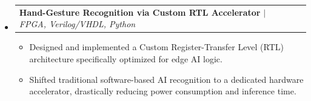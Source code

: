 \documentclass[letterpaper,10pt]{article}
\makeatletter
\newcommand{\resumeItem}[1]{
  \item\small{
    {#1 \vspace{-2pt}}
  }
}
\newcommand{\resumeProjectHeading}[2]{
    \item
    \begin{tabular*}{0.97\textwidth}{l@{\extracolsep{\fill}}r}
      \small#1 & #2 \\
    \end{tabular*}\vspace{-5pt}
}
\makeatother
\begin{document}
\begin{itemize}[leftmargin=0.15in, label={}]
          {\textbf{Advanced Driver Assistance Systems (ADAS)} $|$ \emph{Python, OpenCV, PyTorch, C++, Sensors}}{}
          \begin{itemize}[leftmargin=0.15in, label={\small$\bullet$}]
            \resumeItem{Architected an integrated ADAS pipeline focused on real-time data processing and computer vision.}
            \resumeItem{Fused hardware sensor data with machine learning object detection models to evaluate real-time environmental conditions and reduce processing latency.}
          \end{itemize}
      \vspace{-2pt}
      \resumeProjectHeading
          {\textbf{Hand-Gesture Recognition via Custom RTL Accelerator} $|$ \emph{FPGA, Verilog/VHDL, Python}}{}
          \begin{itemize}[leftmargin=0.15in, label={\small$\bullet$}]
            \resumeItem{Designed and implemented a Custom Register-Transfer Level (RTL) architecture specifically optimized for edge AI logic.}
            \resumeItem{Shifted traditional software-based AI recognition to a dedicated hardware accelerator, drastically reducing power consumption and inference time.}
          \end{itemize}
    \end{itemize}
\end{document}
